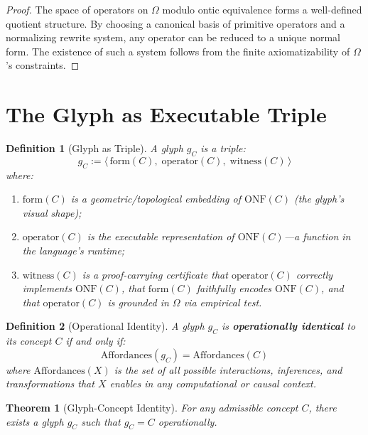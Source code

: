 \documentclass[12pt, letterpaper]{book}
\def\equiv{=}%
\def\mathfrak#1{#1}%
\newtheorem{theorem}{Theorem}[chapter]
\newtheorem{definition}{Definition}[chapter]
\begin{document}
\begin{proof}
The space of operators on $\Omega$ modulo ontic equivalence forms a well-defined quotient structure. By choosing a canonical basis of primitive operators and a normalizing rewrite system, any operator can be reduced to a unique normal form. The existence of such a system follows from the finite axiomatizability of $\Omega$'s constraints.
\end{proof}

\section{The Glyph as Executable Triple}

\begin{definition}[Glyph as Triple]\label{def:glyph-triple}
A glyph $\mathfrak{g}_C$ is a triple:
\[
\mathfrak{g}_C := \langle\, \mathrm{form}(C),\; \mathrm{operator}(C),\; \mathrm{witness}(C)\, \rangle
\]
where:
\begin{enumerate}[label=(\roman*)]
    \item $\mathrm{form}(C)$ is a geometric/topological embedding of $\mathrm{ONF}(C)$ (the glyph's visual shape);
    \item $\mathrm{operator}(C)$ is the executable representation of $\mathrm{ONF}(C)$---a function in the language's runtime;
    \item $\mathrm{witness}(C)$ is a proof-carrying certificate that $\mathrm{operator}(C)$ correctly implements $\mathrm{ONF}(C)$, that $\mathrm{form}(C)$ faithfully encodes $\mathrm{ONF}(C)$, and that $\mathrm{operator}(C)$ is grounded in $\Omega$ via empirical test.
\end{enumerate}
\end{definition}

\begin{definition}[Operational Identity]\label{def:op-identity}
A glyph $\mathfrak{g}_C$ is \textbf{operationally identical} to its concept $C$ if and only if:
\[
\mathrm{Affordances}(\mathfrak{g}_C) = \mathrm{Affordances}(C)
\]
where $\mathrm{Affordances}(X)$ is the set of all possible interactions, inferences, and transformations that $X$ enables in any computational or causal context.
\end{definition}

\begin{theorem}[Glyph-Concept Identity]\label{thm:glyph-concept}
For any admissible concept $C$, there exists a glyph $\mathfrak{g}_C$ such that $\mathfrak{g}_C \equiv C$ operationally.
\end{theorem}
\end{document}
